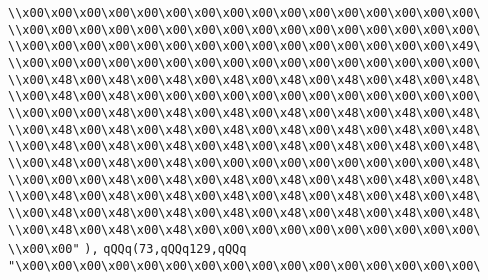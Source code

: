 \verb|\\x00\x00\x00\x00\x00\x00\x00\x00\x00\x00\x00\x00\x00\x00\x00\x00\|\newline
\verb|\\x00\x00\x00\x00\x00\x00\x00\x00\x00\x00\x00\x00\x00\x00\x00\x00\|\newline
\verb|\\x00\x00\x00\x00\x00\x00\x00\x00\x00\x00\x00\x00\x00\x00\x00\x49\|\newline
\verb|\\x00\x00\x00\x00\x00\x00\x00\x00\x00\x00\x00\x00\x00\x00\x00\x00\|\newline
\verb|\\x00\x48\x00\x48\x00\x48\x00\x48\x00\x48\x00\x48\x00\x48\x00\x48\|\newline
\verb|\\x00\x48\x00\x48\x00\x00\x00\x00\x00\x00\x00\x00\x00\x00\x00\x00\|\newline
\verb|\\x00\x00\x00\x48\x00\x48\x00\x48\x00\x48\x00\x48\x00\x48\x00\x48\|\newline
\verb|\\x00\x48\x00\x48\x00\x48\x00\x48\x00\x48\x00\x48\x00\x48\x00\x48\|\newline
\verb|\\x00\x48\x00\x48\x00\x48\x00\x48\x00\x48\x00\x48\x00\x48\x00\x48\|\newline
\verb|\\x00\x48\x00\x48\x00\x48\x00\x00\x00\x00\x00\x00\x00\x00\x00\x48\|\newline
\verb|\\x00\x00\x00\x48\x00\x48\x00\x48\x00\x48\x00\x48\x00\x48\x00\x48\|\newline
\verb|\\x00\x48\x00\x48\x00\x48\x00\x48\x00\x48\x00\x48\x00\x48\x00\x48\|\newline
\verb|\\x00\x48\x00\x48\x00\x48\x00\x48\x00\x48\x00\x48\x00\x48\x00\x48\|\newline
\verb|\\x00\x48\x00\x48\x00\x48\x00\x00\x00\x00\x00\x00\x00\x00\x00\x00\|\newline
\verb|\\x00\x00"|\newline
\verb|),|\newline
\verb|qQQq(73,qQQq129,qQQq|\newline
\verb|"\x00\x00\x00\x00\x00\x00\x00\x00\x00\x00\x00\x00\x00\x00\x00\x00\|\newline
